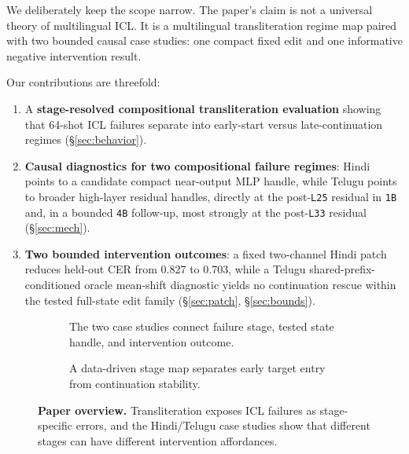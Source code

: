 \documentclass{article}
\begin{document}
We deliberately keep the scope narrow. The paper's claim is not a universal theory of multilingual ICL. It is a multilingual transliteration regime map paired with two bounded causal case studies: one compact fixed edit and one informative negative intervention result.

Our contributions are threefold:
\begin{enumerate}
\item A \textbf{stage-resolved compositional transliteration evaluation} showing that 64-shot ICL failures separate into early-start versus late-continuation regimes (\S\ref{sec:behavior}).
\item \textbf{Causal diagnostics for two compositional failure regimes}: Hindi points to a candidate compact near-output MLP handle, while Telugu points to broader high-layer residual handles, directly at the post-\texttt{L25} residual in \texttt{1B} and, in a bounded \texttt{4B} follow-up, most strongly at the post-\texttt{L33} residual (\S\ref{sec:mech}).
\item \textbf{Two bounded intervention outcomes}: a fixed two-channel Hindi patch reduces held-out CER from 0.827 to 0.703, while a Telugu shared-prefix-conditioned oracle mean-shift diagnostic yields no continuation rescue within the tested full-state edit family (\S\ref{sec:patch}, \S\ref{sec:bounds}).
\end{enumerate}

\begin{figure}[t]
    \centering
    \begin{subfigure}[t]{0.48\textwidth}
        \centering
        \resizebox{\linewidth}{!}{}
        \caption{The two case studies connect failure stage, tested state handle, and intervention outcome.}
        \label{fig:stage_intervention_overview}
    \end{subfigure}\hfill
    \begin{subfigure}[t]{0.48\textwidth}
        \centering
        \resizebox{\linewidth}{!}{}
        \caption{A data-driven stage map separates early target entry from continuation stability.}
        \label{fig:axes}
    \end{subfigure}
    \caption{\textbf{Paper overview.} Transliteration exposes ICL failures as stage-specific errors, and the Hindi/Telugu case studies show that different stages can have different intervention affordances.}
    \label{fig:teaser}
\end{figure}
\end{document}
